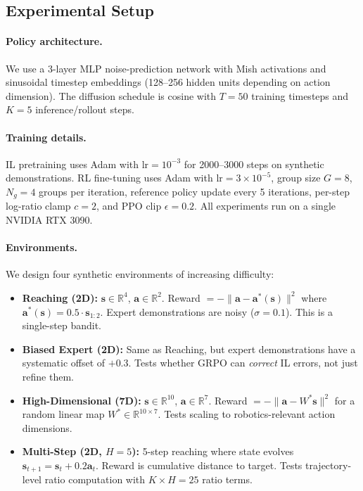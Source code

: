 \documentclass{article}
\newcommand{\R}{\mathbb{R}}
\newcommand{\ba}{\mathbf{a}}
\newcommand{\bs}{\mathbf{s}}
\begin{document}
\subsection{Experimental Setup}

\paragraph{Policy architecture.}
We use a 3-layer MLP noise-prediction network with Mish activations and sinusoidal timestep embeddings (128--256 hidden units depending on action dimension).
The diffusion schedule is cosine with $T=50$ training timesteps and $K=5$ inference/rollout steps.

\paragraph{Training details.}
IL pretraining uses Adam with $\text{lr}=10^{-3}$ for 2000--3000 steps on synthetic demonstrations.
RL fine-tuning uses Adam with $\text{lr}=3\times10^{-5}$, group size $G=8$, $N_g=4$ groups per iteration, reference policy update every 5 iterations, per-step log-ratio clamp $c=2$, and PPO clip $\epsilon=0.2$.
All experiments run on a single NVIDIA RTX 3090.

\paragraph{Environments.}
We design four synthetic environments of increasing difficulty:

\begin{itemize}
\item \textbf{Reaching (2D):} $\bs \in \R^4$, $\ba \in \R^2$.
Reward $= -\|\ba - \ba^*(\bs)\|^2$ where $\ba^*(\bs) = 0.5 \cdot \bs_{1:2}$.
Expert demonstrations are noisy ($\sigma=0.1$).
This is a single-step bandit.

\item \textbf{Biased Expert (2D):} Same as Reaching, but expert demonstrations have a systematic offset of $+0.3$.
Tests whether GRPO can \emph{correct} IL errors, not just refine them.

\item \textbf{High-Dimensional (7D):} $\bs \in \R^{10}$, $\ba \in \R^7$.
Reward $= -\|\ba - W^*\bs\|^2$ for a random linear map $W^* \in \R^{10\times 7}$.
Tests scaling to robotics-relevant action dimensions.

\item \textbf{Multi-Step (2D, $H=5$):} 5-step reaching where state evolves $\bs_{t+1} = \bs_t + 0.2\ba_t$.
Reward is cumulative distance to target.
Tests trajectory-level ratio computation with $K \times H = 25$ ratio terms.
\end{itemize}
\end{document}
